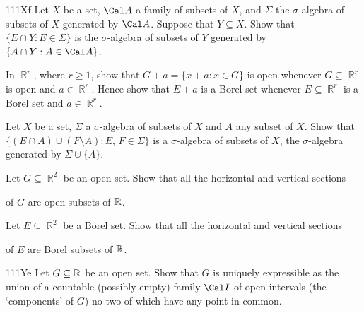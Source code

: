 {\spheader 111Xf Let $X$ be a set, $\Cal A$ a family of subsets of $X$,
and $\Sigma$ the $\sigma$-algebra of subsets of $X$ generated by $\Cal
A$.   Suppose that $Y\subseteq X$.   Show that $\{E\cap Y:E\in\Sigma\}$
is the $\sigma$-algebra of subsets of $Y$ generated by 
$\{A\cap Y:A\in\Cal A\}$.

 In $\BbbR^r$, where $r\ge 1$, show
that $G+a=\{x+a:x\in G\}$ is open whenever $G\subseteq\BbbR^r$ is open
and $a\in\BbbR^r$.   Hence show that $E+a$ is a Borel set whenever
$E\subseteq\BbbR^r$ is a Borel set and $a\in\BbbR^r$.    

 Let $X$ be a set, $\Sigma$ a $\sigma$-algebra of
subsets of $X$ and $A$ any subset of $X$.   Show that $\{(E\cap
A)\cup(F\setminus A):E,\,F\in\Sigma\}$ is a $\sigma$-algebra of subsets
of $X$, the $\sigma$-algebra generated by $\Sigma\cup\{A\}$.

 Let $G\subseteq\BbbR^2$ be an open set.   Show
that all the horizontal and vertical sections


\noindent of $G$ are open subsets of $\Bbb R$.

 Let $E\subseteq\BbbR^2$ be a Borel set.   Show
that all the horizontal and vertical sections


\noindent of $E$ are Borel subsets of $\Bbb R$.   

\spheader 111Ye Let $G\subseteq\Bbb R$ be an open set.   Show that $G$
is uniquely expressible as the union of a countable (possibly empty)
family $\Cal I$ of open intervals (the `components' of $G$) no two of
which have any point in common.   
}%

